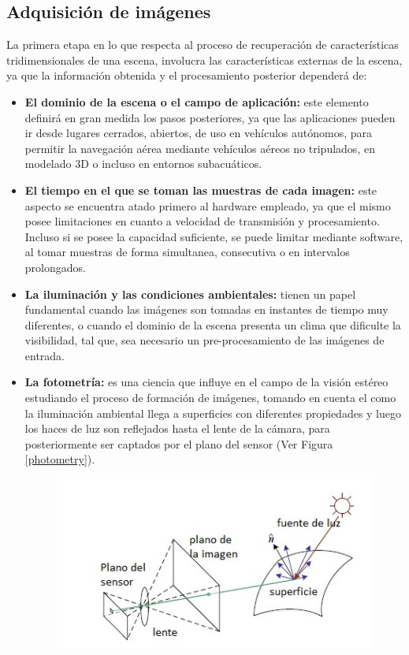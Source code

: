 \subsection{Adquisición de imágenes}
La primera etapa en lo que respecta al proceso de recuperación de características tridimensionales de una escena, involucra las características externas de la escena, ya que la información obtenida y el procesamiento posterior dependerá de:
\begin{itemize}
    \item \textbf{El dominio de la escena o el campo de aplicación:} este elemento definirá en gran medida los pasos posteriores, ya que las aplicaciones pueden ir desde lugares cerrados, abiertos, de uso en vehículos autónomos, para permitir la navegación aérea mediante vehículos aéreos no tripulados, en modelado 3D o incluso en entornos subacuáticos.
    \item  \textbf{El tiempo en el que se toman las muestras de cada imagen:} este aspecto se encuentra atado primero al hardware empleado, ya que el mismo posee limitaciones en cuanto a velocidad de transmisión y procesamiento. Incluso si se posee la capacidad suficiente, se puede limitar mediante software, al tomar muestras de forma simultanea, consecutiva o en intervalos prolongados.
    \item \textbf{La iluminación y las condiciones ambientales:} tienen un papel fundamental cuando las imágenes son tomadas en instantes de tiempo muy diferentes, o cuando el dominio de la escena presenta un clima que dificulte la visibilidad, tal que, sea necesario un pre-procesamiento de las imágenes de entrada.
    \item \textbf{La fotometría:} es una ciencia que influye en el campo de la visión estéreo estudiando el proceso de formación de imágenes, tomando en cuenta el como la iluminación ambiental llega a superficies con diferentes propiedades y luego los haces de luz son reflejados hasta el lente de la cámara, para posteriormente ser captados por el plano del sensor (Ver Figura \ref{photometry}).
    \begin{figure}[H]
        \centering
        \includegraphics{Recursos/fotometria.jpg}

\end{figure}
\end{itemize}
